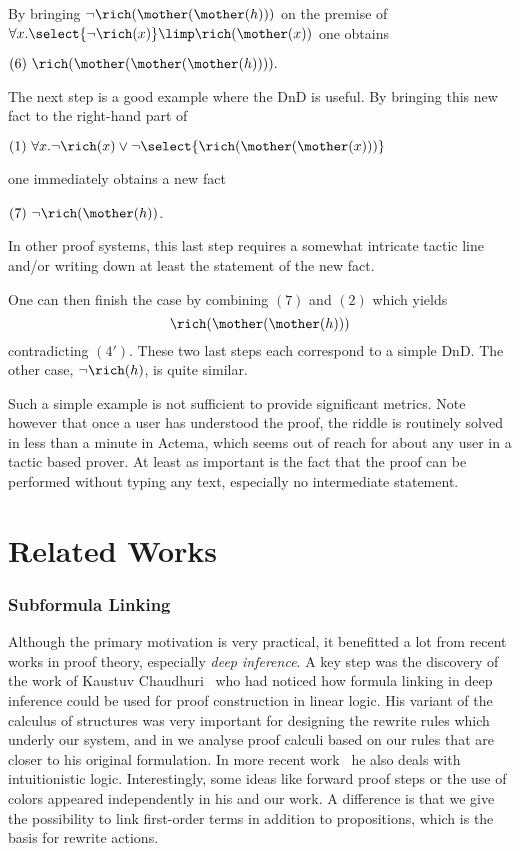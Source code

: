 By bringing 
$\neg\rich(\mother(\mother(h)))$ on the premise of $\forall
x. \select{\neg\rich(x)} \limp \rich(\mother(x))$
one obtains

\medskip
$(6) ~\rich(\mother(\mother(\mother(h)))).$
\medskip

The next step is a good example where the DnD is useful. By bringing
this new fact to the right-hand part of

\medskip
$(1)~\forall x. \neg\rich(x)\lor \neg\select{\rich(\mother(\mother(x)))}$
\medskip

\noindent
one immediately obtains a new fact

\medskip
$(7) ~\neg{\rich(\mother(h))}$.
\medskip

\noindent In other proof systems, this last step requires a somewhat intricate
tactic line and/or writing down at least the statement of the new fact.

One can then finish the case by combining $(7)$ and $(2)$ which yields
$$\rich(\mother(\mother(h)))$$ contradicting $(4')$. These two last steps each
correspond to a simple DnD. The other case, $\neg\rich(h)$, is quite similar.

Such a simple example is not sufficient to provide significant
metrics. Note however that once a user has understood the proof, the
riddle is routinely solved in less than a minute in Actema, which
seems out of reach for about any user in a tactic based prover. At
least as important is the fact that the proof can be performed without
typing any text, especially no intermediate statement. 

\section{Related Works}

\subsubsection*{Subformula Linking}
Although the primary motivation is very practical, it benefitted a lot from
recent works in proof theory, especially \emph{deep inference}. A key step was
the discovery of the work of Kaustuv Chaudhuri~\cite{Chaudhuri2013} who had
noticed how formula linking in deep inference could be used for proof
construction in linear logic. His variant of the calculus of structures was very
important for designing the rewrite rules which underly our system, and in
 we analyse proof calculi based on our rules that are closer to his
original formulation. In more recent work~\cite{DBLP:conf/cade/Chaudhuri21} he
also deals with intuitionistic logic. Interestingly, some ideas like forward
proof steps or the use of colors appeared independently in his and our work. A
difference is that we give the possibility to link first-order terms in addition
to propositions, which is the basis for rewrite actions.




